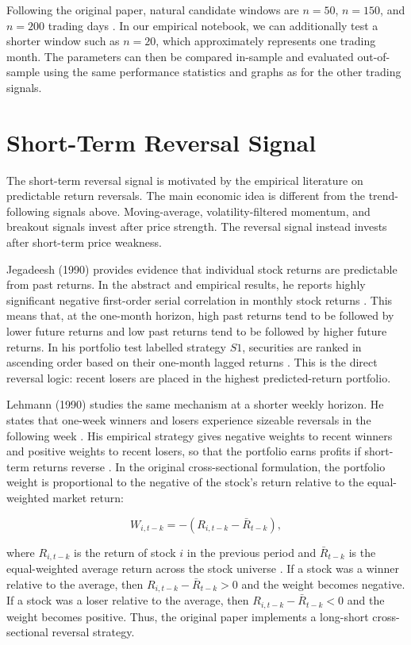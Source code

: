 \documentclass[11pt]{article}
\begin{document}
Following the original paper, natural candidate windows are $n=50$, $n=150$,
and $n=200$ trading days \cite[p.~1736]{brock1992}. In our empirical notebook,
we can additionally test a shorter window such as $n=20$, which approximately
represents one trading month. The parameters can then be compared in-sample and
evaluated out-of-sample using the same performance statistics and graphs as for
the other trading signals.

\section{Short-Term Reversal Signal}

The short-term reversal signal is motivated by the empirical literature on
predictable return reversals. The main economic idea is different from the
trend-following signals above. Moving-average, volatility-filtered momentum,
and breakout signals invest after price strength. The reversal signal instead
invests after short-term price weakness.

Jegadeesh (1990) provides evidence that individual stock returns are predictable
from past returns. In the abstract and empirical results, he reports highly
significant negative first-order serial correlation in monthly stock returns
\cite[p.~881]{jegadeesh1990}. This means that, at the one-month horizon, high
past returns tend to be followed by lower future returns and low past returns
tend to be followed by higher future returns. In his portfolio test labelled
strategy $S1$, securities are ranked in ascending order based on their one-month
lagged returns \cite[pp.~887--888]{jegadeesh1990}. This is the direct reversal
logic: recent losers are placed in the highest predicted-return portfolio.

Lehmann (1990) studies the same mechanism at a shorter weekly horizon. He states
that one-week winners and losers experience sizeable reversals in the following
week \cite[p.~1]{lehmann1990}. His empirical strategy gives negative weights to
recent winners and positive weights to recent losers, so that the portfolio earns
profits if short-term returns reverse \cite[p.~3]{lehmann1990}. In the original
cross-sectional formulation, the portfolio weight is proportional to the negative
of the stock's return relative to the equal-weighted market return:

\[
W_{i,t-k}
=
-\left(R_{i,t-k} - \bar{R}_{t-k}\right),
\]

where $R_{i,t-k}$ is the return of stock $i$ in the previous period and
$\bar{R}_{t-k}$ is the equal-weighted average return across the stock universe
\cite[p.~4]{lehmann1990}. If a stock was a winner relative to the average, then
$R_{i,t-k} - \bar{R}_{t-k} > 0$ and the weight becomes negative. If a stock was a
loser relative to the average, then $R_{i,t-k} - \bar{R}_{t-k} < 0$ and the
weight becomes positive. Thus, the original paper implements a long-short
cross-sectional reversal strategy.
\end{document}
